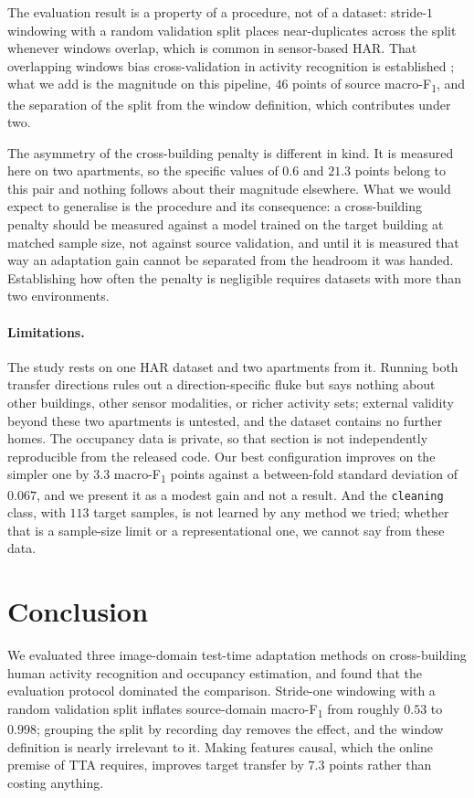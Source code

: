 \documentclass[a4paper,fleqn]{cas-dc}
\newcommand{\macf}{macro-F\textsubscript{1}}
\begin{document}
The evaluation result is a property of a procedure, not of a dataset: stride-$1$
windowing with a random validation split places near-duplicates across the split whenever
windows overlap, which is common in sensor-based HAR. That overlapping windows bias
cross-validation in activity recognition is established \cite{hammerla2015}; what we add
is the magnitude on this pipeline, $46$ points of source \macf{}, and the separation of
the split from the window definition, which contributes under two.

The asymmetry of the cross-building penalty is different in kind. It is measured here on
two apartments, so the specific values of $0.6$ and $21.3$ points belong to this pair and
nothing follows about their magnitude elsewhere. What we would expect to generalise is the
procedure and its consequence: a cross-building penalty should be measured against a model
trained on the target building at matched sample size, not against source validation, and
until it is measured that way an adaptation gain cannot be separated from the headroom it
was handed. Establishing how often the penalty is negligible requires datasets with more
than two environments.

\paragraph{Limitations.} The study rests on one HAR dataset and two apartments from it.
Running both transfer directions rules out a direction-specific fluke but says nothing
about other buildings, other sensor modalities, or richer activity sets; external validity
beyond these two apartments is untested, and the dataset contains no further homes. The
occupancy data is private, so that section is not independently
reproducible from the released code. Our best configuration improves on the simpler one by
$3.3$ \macf{} points against a between-fold standard deviation of $0.067$, and we present
it as a modest gain and not a result. And the \texttt{cleaning} class, with $113$ target
samples, is not learned by any method we tried; whether that is a sample-size limit or a
representational one, we cannot say from these data.

\section{Conclusion}
\label{sec:conclusion}

We evaluated three image-domain test-time adaptation methods on cross-building human
activity recognition and occupancy estimation, and found that the evaluation protocol
dominated the comparison. Stride-one windowing with a random validation split inflates
source-domain \macf{} from roughly $0.53$ to $0.998$; grouping the split by recording day
removes the effect, and the window definition is nearly irrelevant to it. Making features
causal, which the online premise of TTA requires, improves target transfer by $7.3$ points
rather than costing anything.
\end{document}
